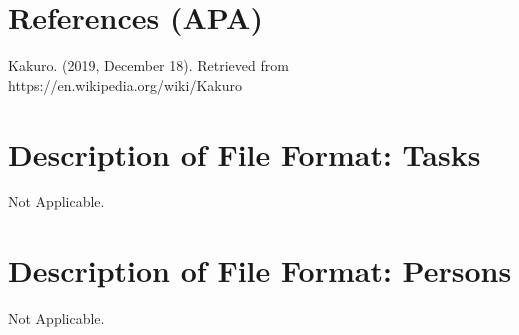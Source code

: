 \documentclass[12pt]{article}
\begin{document}
\clearpage

\section{References (APA)}

Kakuro. (2019, December 18). Retrieved from https://en.wikipedia.org/wiki/Kakuro
\clearpage
\appendix

\section{Description of File Format: Tasks}

Not Applicable.

\section{Description of File Format: Persons}

Not Applicable.
\end{document}
